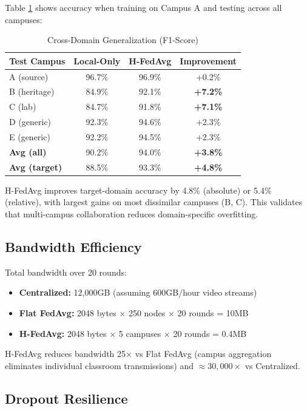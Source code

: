 \documentclass[conference]{IEEEtran}
\begin{document}
Table \ref{tab:cross_domain} shows accuracy when training on Campus A and testing across all campuses:

\begin{table}[h]
\centering
\caption{Cross-Domain Generalization (F1-Score)}
\label{tab:cross_domain}
\begin{tabular}{lccc}
\toprule
\textbf{Test Campus} & \textbf{Local-Only} & \textbf{H-FedAvg} & \textbf{Improvement} \\
\midrule
A (source) & 96.7\% & 96.9\% & +0.2\% \\
B (heritage) & 84.9\% & 92.1\% & \textbf{+7.2\%} \\
C (lab) & 84.7\% & 91.8\% & \textbf{+7.1\%} \\
D (generic) & 92.3\% & 94.6\% & +2.3\% \\
E (generic) & 92.2\% & 94.5\% & +2.3\% \\
\midrule
\textbf{Avg (all)} & 90.2\% & 94.0\% & \textbf{+3.8\%} \\
\textbf{Avg (target)} & 88.5\% & 93.3\% & \textbf{+4.8\%} \\
\bottomrule
\end{tabular}
\end{table}

H-FedAvg improves target-domain accuracy by 4.8\% (absolute) or 5.4\% (relative), with largest gains on most dissimilar campuses (B, C). This validates that multi-campus collaboration reduces domain-specific overfitting.

\subsection{Bandwidth Efficiency}

Total bandwidth over 20 rounds:
\begin{itemize}
    \item \textbf{Centralized:} 12,000GB (assuming 600GB/hour video streams)
    \item \textbf{Flat FedAvg:} 2048 bytes $\times$ 250 nodes $\times$ 20 rounds = 10MB
    \item \textbf{H-FedAvg:} 2048 bytes $\times$ 5 campuses $\times$ 20 rounds = 0.4MB
\end{itemize}

H-FedAvg reduces bandwidth 25$\times$ vs Flat FedAvg (campus aggregation eliminates individual classroom transmissions) and $\approx 30,000\times$ vs Centralized.

\subsection{Dropout Resilience}
\end{document}
